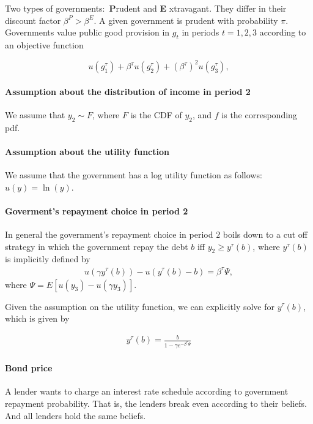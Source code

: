 \documentclass{article}
\begin{document}
\bigskip Two types of governments:\ \textbf{P}rudent and \textbf{E}%
xtravagant. They differ in their discount factor $\beta ^{P}>\beta ^{E}$. A
given government is prudent with probability $\pi .$ Governments value
public good provision in $g_{t}$ in periods $t=1,2,3$ according to an
objective function

\begin{equation*}
u\left( g_{1}^{\tau }\right) +\beta ^{\tau }u\left( g_{2}^{\tau }\right) + \left(\beta^{\tau} \right)^2 u\left(g^{\tau}_3\right),
\end{equation*}%


\paragraph{Assumption about the distribution of income in period 2}

We assume that $y_2\sim F$, where $F$ is the CDF of $y_2$, and $f$ is the corresponding pdf.

\paragraph{Assumption about the utility function}
We assume that the government has a log utility function as follows: $u(y) = \ln(y)$.

\paragraph{Goverment's repayment choice in period 2}
In general the government's repayment choice in period $2$ boils down to a cut off strategy in which the government repay the debt $b$ iff $y_2\geq y^{\tau}(b)$, where $y^{\tau}(b)$ is implicitly defined by
\begin{align*}
u(\gamma y^{\tau}(b)) - u(y^{\tau}(b)-b) = \beta^{\tau} \Psi,
\end{align*}
where $\Psi = E[u(y_3)-u(\gamma y_3)]$.

Given the assumption on the utility function, we can explicitly solve for $y^{\tau}(b)$, which is given by

\begin{align*}
y^{\tau}(b) = \frac{b}{1-\gamma e^{-\beta^{\tau} \Psi}}
\end{align*}

\paragraph{Bond price}
A lender wants to charge an interest rate schedule according to government repayment probability. That is, the lenders break even according to their beliefs. And all lenders hold the same beliefs. 
\end{document}
